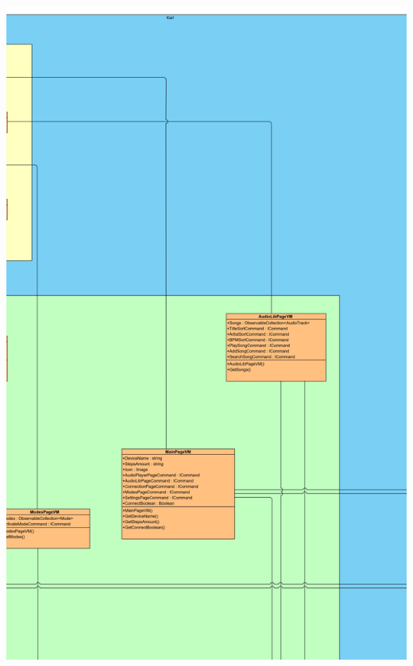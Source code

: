 \documentclass[../entwurf.tex]{subfiles}
\begin{document}
\newpage
\includegraphics[scale=0.12]{../graphics/uml_diagramme/Gesamt/2.png}
\newpage
\end{document}

